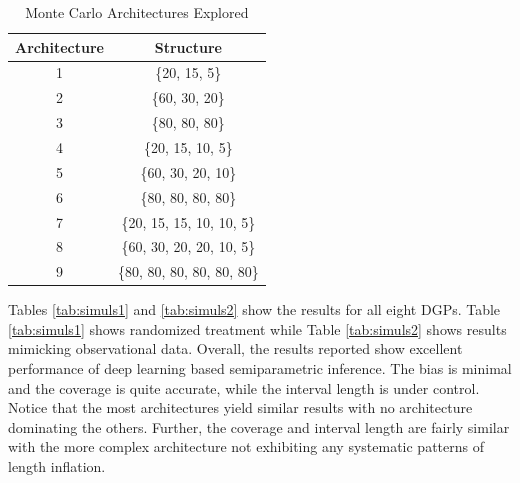 \documentclass[11pt]{article}
\numberwithin{equation}{section}
\theoremstyle{definition}
\begin{document}
\begin{table}
	\caption{\label{tab:MonteCarlo-Networks}Monte Carlo Architectures Explored}
	
	\centering{}%
	\begin{tabular}{cc}
		\hline 
		Architecture & Structure\tabularnewline
		\hline 
		1 & \{20, 15, 5\}\tabularnewline
		2 & \{60, 30, 20\}\tabularnewline
		3 & \{80, 80, 80\}\tabularnewline
		4 & \{20, 15, 10, 5\}\tabularnewline
		5 & \{60, 30, 20, 10\}\tabularnewline
		6 & \{80, 80, 80, 80\}\tabularnewline
		7 & \{20, 15, 15, 10, 10, 5\}\tabularnewline
		8 & \{60, 30, 20, 20, 10, 5\}\tabularnewline
		9 & \{80, 80, 80, 80, 80, 80\}\tabularnewline
		\hline 
	\end{tabular}
\end{table}

Tables \ref{tab:simuls1} and \ref{tab:simuls2} show the results for all eight DGPs. Table \ref{tab:simuls1} shows randomized treatment while Table \ref{tab:simuls2} shows results mimicking observational data. Overall, the results reported show excellent performance of deep learning based semiparametric inference. The bias is minimal and the coverage is quite accurate, while the interval length is under control. Notice that the most architectures yield similar results with no architecture dominating the others. Further, the coverage and interval length are fairly similar with the more complex architecture not exhibiting any systematic patterns of length inflation. 
\end{document}

